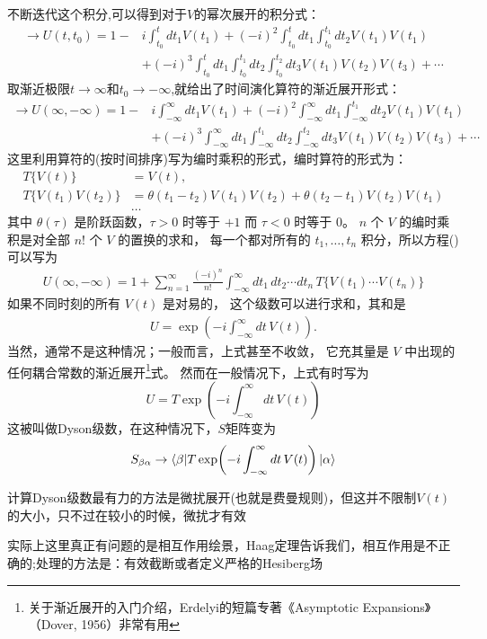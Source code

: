 不断迭代这个积分,可以得到对于$V$的幂次展开的积分式：
\[    \begin{aligned}
        \rightarrow U(t,t_0)=1-&i\int^{t}_{t_0}dt_1V(t_1)+(-i)^2\int^{t}_{t_0}dt_1\int_{t_0}^{t_1}dt_2V(t_1)V(t_1)\\
        &+(-i)^3\int^{t}_{t_0}dt_1\int^{t_1}_{t_0}dt_2\int^{t_2}_{t_0}dt_3V(t_1)V(t_2)V(t_3)+\cdots
    \end{aligned}\]
取渐近极限$t\rightarrow\infty$和$t_0\rightarrow-\infty$,就给出了时间演化算符的渐近展开形式：
\begin{equation}\label{dyson}
    \begin{aligned}
        \rightarrow U(\infty,-\infty)=1-&i\int^{\infty}_{-\infty}dt_1V(t_1)+(-i)^2\int^{\infty}_{-\infty}dt_1\int_{-\infty}^{t_1}dt_2V(t_1)V(t_1)\\
        &+(-i)^3\int^{\infty}_{-\infty}dt_1\int^{t_1}_{-\infty}dt_2\int^{t_2}_{-\infty}dt_3V(t_1)V(t_2)V(t_3)+\cdots
    \end{aligned}
\end{equation}
这里利用算符的(按时间排序)写为编时乘积的形式，编时算符的形式为：
\[
\begin{aligned}
T\{V(t)\} &= V(t), \\
T\{V(t_1)V(t_2)\} &= \theta(t_1-t_2)V(t_1)V(t_2)
+ \theta(t_2-t_1)V(t_2)V(t_1)\\
&\ldots
\end{aligned}
\]
其中 $\theta(\tau)$ 是阶跃函数，$\tau>0$ 时等于 $+1$ 而 $\tau<0$ 时等于 $0$。
$n$ 个 $V$ 的编时乘积是对全部 $n!$ 个 $V$ 的置换的求和，
每一个都对所有的 $t_1,\ldots,t_n$ 积分，所以方程()可以写为
\begin{equation*}
    \begin{aligned}
        U(\infty,-\infty)
        = 1 + \sum_{n=1}^{\infty} \frac{(-i)^n}{n!}
        \int_{-\infty}^{\infty} dt_1\,dt_2 \cdots dt_n\,
        T\{V(t_1)\cdots V(t_n)\}
\end{aligned}
\end{equation*}
如果不同时刻的所有 $V(t)$ 是对易的，
这个级数可以进行求和，其和是
\[
\begin{aligned}
U = \exp\!\left(-i\int_{-\infty}^{\infty} dt\,V(t)\right).
\end{aligned}
\]
当然，通常不是这种情况；一般而言，上式甚至不收敛，
它充其量是 $V$ 中出现的任何耦合常数的渐近展开\footnote{关于渐近展开的入门介绍，Erdelyi的短篇专著《Asymptotic Expansions》（Dover, 1956）非常有用}式。
然而在一般情况下，上式有时写为
\begin{equation}\label{dyson_ser}
        U = T \exp\!\left(-i\int_{-\infty}^{\infty} dt\,V(t)\right)   
\end{equation}
这被叫做Dyson级数，在这种情况下，$S$矩阵变为
\begin{equation}\label{time_order_s_matrix}
    S_{\beta\alpha}\to\braket{\beta|T \exp\!\left(-i\int_{-\infty}^{\infty} dt\,V(t)\right)|\alpha}
\end{equation}

\begin{tcolorbox}[colback=white!5,colframe=black!45]
计算Dyson级数最有力的方法是微扰展开(也就是费曼规则)，但这并不限制$V(t)$的大小，只不过在较小的时候，微扰才有效

\color{blue}实际上这里真正有问题的是相互作用绘景，Haag定理告诉我们，相互作用是不正确的;处理的方法是：有效截断或者定义严格的Hesiberg场\normalcolor
\end{tcolorbox}
